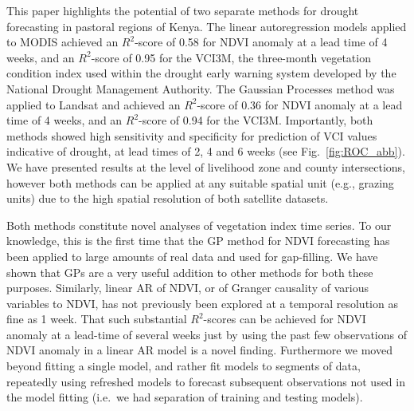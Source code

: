 \documentclass[review]{elsarticle}
\begin{document}
This paper highlights the potential of two separate methods for drought forecasting in pastoral regions of Kenya. The linear autoregression models applied to MODIS achieved an $R^2$-score of 0.58 for NDVI anomaly at a lead time of 4 weeks, and an $R^2$-score of 0.95 for the VCI3M, the three-month vegetation condition index used within the drought early warning system developed by the National Drought Management Authority. The Gaussian Processes method was applied to Landsat and achieved an $R^2$-score of 0.36 for NDVI anomaly at a lead time of 4 weeks, and an $R^2$-score of 0.94 for the VCI3M.  Importantly, both methods showed high sensitivity and specificity for prediction of VCI values indicative of drought, at lead times of 2, 4 and 6 weeks (see Fig.~\ref{fig:ROC_abb}). We have presented results at the level of livelihood zone and county intersections, however both methods can be applied at any suitable spatial unit (e.g., grazing units) due to the high spatial resolution of both satellite datasets.


Both methods constitute novel analyses of vegetation index time series. To our knowledge, this is the first time that the GP method for NDVI forecasting has been applied to large amounts of real data and used for gap-filling. We have shown that GPs are a very useful addition to other methods for both these purposes. Similarly, linear AR of NDVI, or of Granger causality of various variables to NDVI, has not previously been explored at a temporal resolution as fine as 1 week. That such substantial $R^2$-scores can be achieved for NDVI anomaly at a lead-time of several weeks just by using the past few observations of NDVI anomaly in a linear AR model is a novel finding. Furthermore we moved beyond fitting a single model, and rather fit models to segments of data, repeatedly using refreshed models to forecast subsequent observations not used in the model fitting (i.e.~we had separation of training and testing models). 
\end{document}
